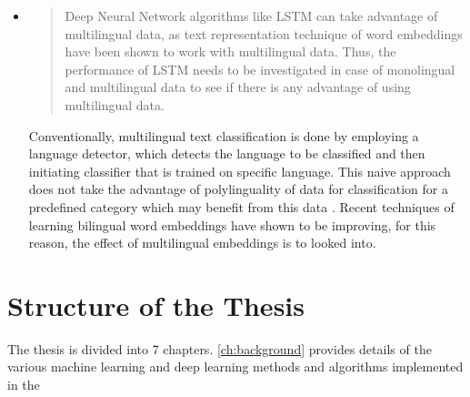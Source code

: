 \begin{itemize}
    
    \item
    \begin{quote}
      Deep Neural Network algorithms like \gls{LSTM} can take advantage of multilingual data, as text representation technique of word embeddings have been shown to work with multilingual data. Thus, the performance of \gls{LSTM} needs to be investigated in case of monolingual and multilingual data to see if there is any advantage of using multilingual data.
    \end{quote}
     Conventionally, multilingual text classification is done by employing a language detector, which detects the language to be classified and then initiating classifier that is trained on specific language. This naive approach does not take the advantage of polylinguality of data for classification for a predefined category which may benefit from this data \cite{Wei:2014:EPD:2566999.2567111}. Recent techniques of learning bilingual word embeddings \cite{D13-1141,NIPS2014_5270} have shown to be improving, for this reason, the effect of multilingual embeddings is to looked into. 
\end{itemize}

\section{Structure of the Thesis}
The thesis is divided into 7 chapters. \ref{ch:background} provides details of the various machine learning and deep learning methods and algorithms implemented in the  